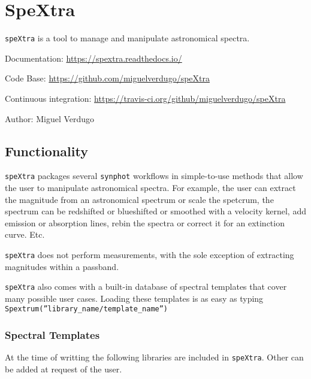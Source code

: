 

\section{SpeXtra%
  \label{spextra}%
}

\texttt{speXtra} is a tool to manage and manipulate astronomical spectra. 

Documentation: \url{https://spextra.readthedocs.io/}

Code Base: \url{https://github.com/miguelverdugo/speXtra}

Continuous integration: \url{https://travis-ci.org/github/miguelverdugo/speXtra}

Author: Miguel Verdugo


\subsection{Functionality%
  \label{functionality}%
}

\texttt{speXtra} packages several \texttt{synphot} workflows in simple-to-use methods that allow the user 
to manipulate astronomical spectra. For example, the user
can extract the magnitude from an astronomical spectrum or 
scale the spetcrum, the spectrum can be redshifted or 
blueshifted or smoothed with a velocity kernel, add emission or absorption lines, rebin the spectra or correct it for an extinction curve. Etc.

\texttt{speXtra} does not perform measurements, with the sole exception of extracting magnitudes within a passband. 

\texttt{speXtra} also comes with a built-in database of spectral templates  that cover many possible user cases. Loading these templates is as easy as typing \texttt{Spextrum(''library\_name/template\_name'')}
 

\subsubsection{Spectral Templates}

At the time of writting the following libraries are included in \texttt{speXtra}. Other can be added 
at request of the user. 

